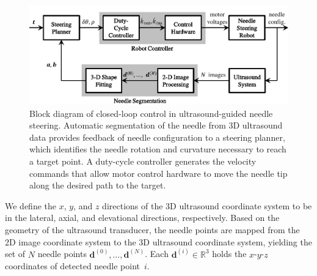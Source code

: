 \begin{figure}[!t]
\centering
\includegraphics[width=\columnwidth]{Images/Chapter2/ControlBlockDiagram/ControlBlockDiagram}%
\caption{Block diagram of closed-loop control in ultrasound-guided needle steering. Automatic segmentation of the needle from 3D ultrasound data provides feedback of needle configuration to a steering planner, which identifies the needle rotation and curvature necessary to reach a target point. A duty-cycle controller generates the velocity commands that allow motor control hardware to move the needle tip along the desired path to the target.}
\label{fig:ControlBlockDiagram}
\end{figure}

We define the $x$, $y$, and $z$ directions of the 3D ultrasound coordinate system to be in the lateral, axial, and elevational directions, respectively. Based on the geometry of the ultrasound transducer, the needle points are mapped from the 2D image coordinate system to the 3D ultrasound coordinate system, yielding the set of $N$ needle points $\bm{d}^{(0)}, \dotsc, \bm{d}^{(N)}$. Each $\bm{d}^{(i)} \in \mathbb{R}^{3}$ holds the $x$-$y$-$z$ coordinates of detected needle point~$i$.

